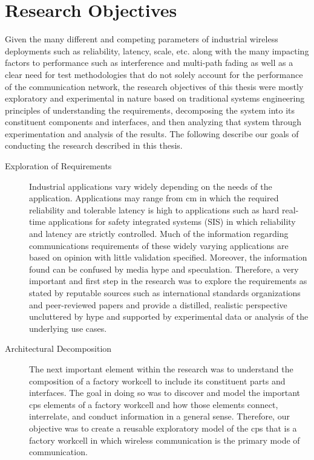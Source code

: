 {
	
\section{Research Objectives}

Given the many different and competing parameters of industrial wireless deployments such as reliability, latency, scale, etc. along with the many impacting factors to performance such as interference and multi-path fading as well as a clear need for test methodologies that do not solely account for the performance of the communication network, the research objectives of this thesis were mostly exploratory and experimental in nature based on traditional systems engineering principles of understanding the requirements, decomposing the system into its constituent components and interfaces, and then analyzing that system through experimentation and analysis of the results.  The following describe our goals of conducting the research described in this thesis.

\begin{description}
	\item[Exploration of Requirements] Industrial applications vary widely depending on the needs of the application.  Applications may range from \gls{cm} in which the required reliability and tolerable latency is high to applications such as hard real-time applications for safety integrated systems (SIS) in which reliability and latency are strictly controlled.  Much of the information regarding communications requirements of these widely varying applications are based on opinion with little validation specified.  Moreover, the information found can be confused by media hype and speculation.  Therefore, a very important and first step in the research was to explore the requirements as stated by reputable sources such as international standards organizations and peer-reviewed papers and provide a distilled, realistic perspective uncluttered by hype and supported by experimental data or analysis of the underlying use cases.
	
	\item[Architectural Decomposition] The next important element within the research was to understand the composition of a factory workcell to include its constituent parts and interfaces.  The goal in doing so was to discover and model the important \gls{cps} elements of a factory workcell and how those elements connect, interrelate, and conduct information in a general sense.  Therefore, our objective was to create a reusable exploratory model of the \gls{cps} that is a factory workcell in which wireless communication is the primary mode of communication.
	

\end{description}}
